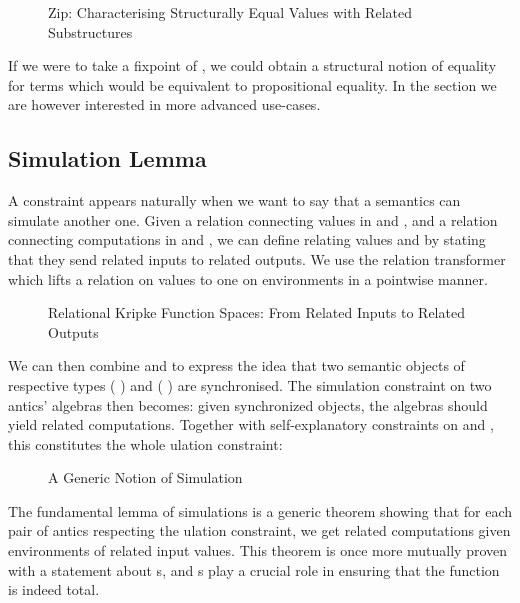 \begin{figure}[h]
\caption{Zip: Characterising Structurally Equal Values with Related Substructures}
\end{figure}

If we were to take a fixpoint of , we could obtain a structural
notion of equality for terms which would be equivalent to propositional
equality. In the section we are however interested in more advanced
use-cases.



\subsection{Simulation Lemma}

A  constraint appears naturally when we want to say that a
semantics can simulate another one. Given a relation  connecting values
in  and , and a relation  connecting computations in
 and , we can define  relating values
   and   
by stating that they send related inputs to related outputs. We use
the relation transformer  which lifts a relation on values
to one on environments in a pointwise manner.

\begin{figure}[h]
\caption{Relational Kripke Function Spaces: From Related Inputs to Related Outputs}
\end{figure}

We can then combine  and  to express the idea
that two semantic objects of respective types
   (  ) and
   (  ) are
synchronised. The simulation constraint on two antics' algebras
then becomes: given synchronized objects, the algebras should yield
related computations. Together with self-explanatory constraints on
 and , this constitutes the whole ulation
constraint:

\begin{figure}[h]
\caption{A Generic Notion of Simulation}
\end{figure}

The fundamental lemma of simulations is a generic theorem showing that for
each pair of antics respecting the ulation constraint, we
get related computations given environments of related input values. This
theorem is once more mutually proven with a statement about s,
and s play a crucial role in ensuring that the function is indeed total.

